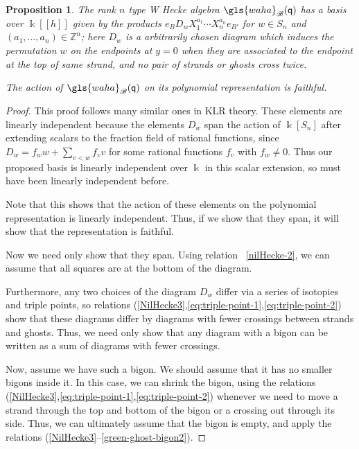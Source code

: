 \documentclass[10pt]{article}
\newtheorem{prop}[theorem]{Proposition}
\theoremstyle{definition}
\newcommand{\pq}{\mathsf{q}}
\newcommand{\K}{\Bbbk}%
\newcommand{\Z}{\mathbb{Z}}
\newcommand{\waha}{\gls{waha}}
\newcommand\llbracket{[\![}
\newcommand\rrbracket{]\!]}
\begin{document}
\begin{prop}\label{prop:waha-basis}
 The rank $n$ type W Hecke algebra $\waha_{\mathscr{B}}(\pq)$ has a basis over $\K\llbracket h\rrbracket $ given by the products
 $e_{B}D_wX_1^{a_1}\cdots X_n^{a_n}e_{B'}$ for $w\in S_n$ and $(a_1,\dots,
 a_n)\in \Z^n$; here $D_w$ is a arbitrarily chosen diagram which
 induces the permutation $w$ on the endpoints at $y=0$ when they are
 associated to the endpoint at the top of same strand, and no pair of
 strands or ghosts cross twice.

 The action of $\waha_{\mathscr{B}}(\pq)$ on its polynomial
 representation is faithful.
\end{prop}
\begin{proof}
 This proof follows many similar ones in KLR theory. These elements
 are linearly independent because the elements $D_w$ span the action
 of $\K[S_n]$ after extending scalars to the fraction field of
 rational functions, since $D_w=f_w w+\sum_{v<w} f_v v$ for some
 rational functions $f_v$ with $f_w\neq 0$. Thus our proposed basis
 is linearly independent over $\K$ in this scalar extension, so must
 have been linearly independent before.

 Note that this shows that the action of these elements on the
 polynomial representation is linearly independent. Thus, if we show
 that they span, it will show that the representation is faithful. 

 Now we need only show that they span. Using relation
~\eqref{nilHecke-2}, we can assume that all squares are at the bottom
 of the diagram. 

Furthermore, any two choices of the diagram $D_w$ differ via a series
of isotopies and triple points, so relations
(\ref{NilHecke3},\ref{eq:triple-point-1},\ref{eq:triple-point-2}) show
that these diagrams differ by diagrams with fewer crossings between
strands and ghosts. Thus, we
need only show that any diagram with a bigon can be written as a sum
of diagrams with fewer crossings. 

Now, assume we have such a bigon. We should assume that it has no
smaller bigons inside it. In this case, we can shrink the bigon,
using the relations
(\ref{NilHecke3},\ref{eq:triple-point-1},\ref{eq:triple-point-2})
whenever we need to move a strand through the top and bottom of the
bigon or a crossing out through its side. Thus, we can ultimately
assume that the bigon is empty, and apply the relations (\ref{NilHecke3}--\ref{green-ghost-bigon2}).
\end{proof}
\end{document}
